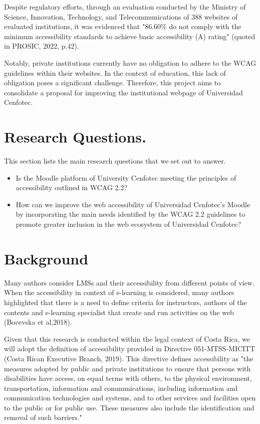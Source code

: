 \documentclass{IEEEtran}
\begin{document}
Despite regulatory efforts, through an evaluation conducted by the Ministry of Science, Innovation, Technology, and Telecommunications of 388 websites of evaluated institutions, it was evidenced that "86.60\% do not comply with the minimum accessibility standards to achieve basic accessibility (A) rating" (quoted in PROSIC, 2022, p.42).

Notably, private institutions currently have no obligation to adhere to the WCAG guidelines within their websites. In the context of education, this lack of obligation poses a significant challenge. Therefore, this project aims to consolidate a proposal for improving the institutional webpage of Universidad Cenfotec.

\section{Research Questions.}
This section lists the main research questions that we set out to answer.
\begin{itemize}
    \item Is the Moodle platform of University Cenfotec meeting the principles of accessibility outlined in WCAG 2.2?
    \item How can we improve the web accessibility of Universidad Cenfotec's Moodle by incorporating the main needs identified by the WCAG 2.2 guidelines to promote greater inclusion in the web ecosystem of Universidad Cenfotec?
\end{itemize}

\section{Background}
Many authors consider LMSs and their accessibility from different points of view. When the accessibility in context of e-learning is considered, many authors highlighted that there is a need to define criteria for instructors, authors of the contents and e-learning specialist that create and run activities on the web (Bocevska et al,2018).

Given that this research is conducted within the legal context of Costa Rica, we will adopt the definition of accessibility provided in Directive 051-MTSS-MICITT (Costa Rican Executive Branch, 2019). This directive defines accessibility as "the measures adopted by public and private institutions to ensure that persons with disabilities have access, on equal terms with others, to the physical environment, transportation, information and communications, including information and communication technologies and systems, and to other services and facilities open to the public or for public use. These measures also include the identification and removal of such barriers."
\end{document}

